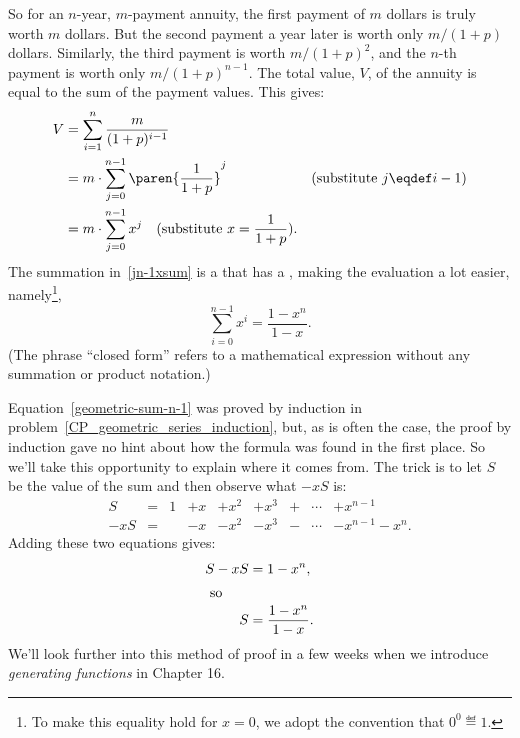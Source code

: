 So for an $n$-year, $m$-payment annuity, the first payment of $m$ dollars
is truly worth $m$ dollars.  But the second payment a year later is worth
only $m/(1+p)$ dollars.  Similarly, the third payment is worth
$m/(1+p)^2$, and the $n$-th payment is worth only $m/(1+p)^{n-1}$.  The
total value, $V$, of the annuity is equal to the sum of the payment
values.  This gives:
\begin{align}
  V & = \sum_{i=1}^n \frac{m}{(1+p)^{i-1}}\notag\\
  & = m \cdot \sum_{j=0}^{n-1} \paren{\frac{1}{1+p}}^j & \text{(substitute $j \eqdef i-1$)}\notag\\
  & = m \cdot \sum_{j=0}^{n-1} x^j \quad (\mbox{substitute} \ x =
  \frac{1}{1+p}).\label{jn-1xsum}
\end{align}
The summation in~\eqref{jn-1xsum} is a  that has a
, making the evaluation a lot easier, namely\footnote{To
  make this equality hold for $x=0$, we adopt the convention that $0^0
  \eqdef 1$.},
\begin{equation}\label{geometric-sum-n-1}
\sum_{i=0}^{n-1} x^i = \frac{1- x^n}{1 - x}.
\end{equation}
(The phrase ``closed form'' refers to a mathematical expression without
any summation or product notation.)

Equation~\eqref{geometric-sum-n-1} was proved by induction in
problem~\ref{CP_geometric_series_induction}, but, as is often the case,
the proof by induction gave no hint about how the formula was found in the
first place.  So we'll take this opportunity to explain where it comes
from.  The trick is to let $S$ be the value of the sum and then observe
what $-xS$ is:
\[\begin{array}{rclllllcl}
  S & = & 1 & +  x & + x^2 & + x^3 & + &\cdots & + x^{n-1} \\
-xS & = &   & -  x & - x^2 & - x^3 & - &\cdots & - x^{n-1} - x^{n}.
\end{array}\]
Adding these two equations gives:
\begin{align*}
S-xS  & =  1 - x^n, \\
\intertext{  so}
S     & = \frac{1 - x^n}{1 - x}.
\end{align*}
We'll look further into this method of proof in a few weeks when we
introduce \emph{generating functions} in 
Chapter 16.%

\iffalse


